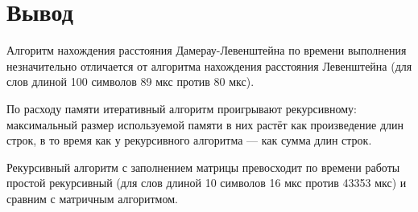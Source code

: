\section*{Вывод}

Алгоритм нахождения расстояния Дамерау-Левенштейна по времени выполнения незначительно отличается от алгоритма нахождения расстояния Левенштейна (для слов длиной 100 символов 89 мкс против 80 мкс).

По расходу памяти итеративный алгоритм проигрывают рекурсивному: максимальный размер используемой памяти в них растёт как произведение длин строк, в то время как у рекурсивного алгоритма --- как сумма длин строк.

Рекурсивный алгоритм с заполнением матрицы превосходит по времени работы простой рекурсивный (для слов длиной 10 символов 16 мкс против 43353 мкс) и сравним с матричным алгоритмом.


